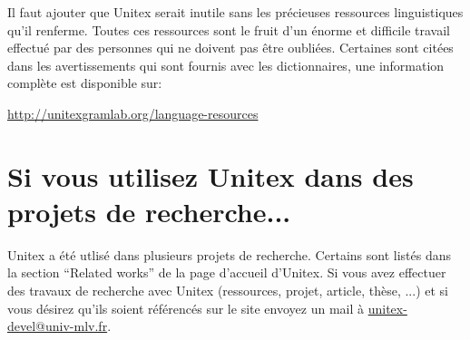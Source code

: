 \bigskip
\noindent Il faut ajouter que Unitex serait inutile sans les précieuses ressources linguistiques
qu'il renferme. Toutes ces ressources sont le fruit d'un énorme et difficile travail effectué par
des personnes qui ne doivent pas être oubliées. Certaines sont citées dans les avertissements qui
sont fournis avec les dictionnaires, une information complète est disponible sur:

\bigskip
\noindent \url{http://unitexgramlab.org/language-resources}


\section*{Si vous utilisez Unitex dans des projets de recherche...}
Unitex a été utlisé dans plusieurs projets de recherche. Certains sont listés dans la section 
``Related works'' de la page d'accueil d'Unitex. Si vous avez effectuer des travaux de recherche
avec Unitex (ressources, projet, article, thèse, ...) et si vous désirez qu'ils soient référencés
sur le site envoyez un mail à \url{unitex-devel@univ-mlv.fr}.

